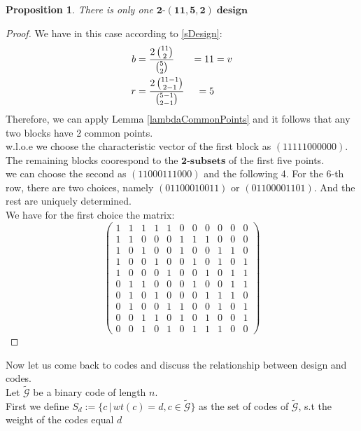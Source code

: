 \documentclass{article}
\newtheorem{prop}[theorem]{Proposition}
\numberwithin{equation}{theorem}
\numberwithin{figure}{theorem}
\newcommand{\tParamDesign}[4]{\ensuremath{\bm{#1\mbox{-}(#2,#3,#4)\; design}}}
\newcommand{\cCodes}{\ensuremath{\widetilde{\mathscr{G}}}}
\newcommand{\tSubset}[1]{\ensuremath{\bm{#1\mbox{-}{subset}}}}
\newcommand{\wloe}{w.l.o.e}
\begin{document}
\begin{prop}\label{onlyOneDesign}
There is only one \tParamDesign{2}{11}{5}{2}
\end{prop}
\begin{proof}
We have in this case according to \eqref{sDesign}:
\begin{alignat}{3}
	b &= \frac{2\,\binom{11}{2}}{\binom{5}{2}} & = 11 &= v \notag\\
	r &= \frac{2 \, \binom{11-1}{2 - 1}}{\binom{5-1}{2 - 1}} & = 5 & \notag\phantom{v} 
\end{alignat}
Therefore, we can apply Lemma \ref{lambdaCommonPoints} and it follows that any two blocks have 2 common points.\\
{\wloe} we choose the characteristic vector of the first block as 
$(1 1 1 1 1 0 0 0 0 0 0)$. The remaining blocks coorespond to the {\tSubset{2}}\textbf{s} of the first five points.\\
we can choose the second as $(1 1 0 0 0 1 1 1 0 0 0)$ and the following 4. For the $6$-th row, there are two choices, namely
$(0 1 1 0 0 0 1 0 0 1 1)$ or $(0 1 1 0 0 0 0 1 1 0 1)$. And the rest are uniquely determined. \\
We have for the first choice the matrix:
\[
	\begin{pmatrix}
 1 & 1 & 1 & 1 & 1 & 0 & 0 & 0 & 0 & 0 & 0 \\
 1 & 1 & 0 & 0 & 0 & 1 & 1 & 1 & 0 & 0 & 0 \\
 1 & 0 & 1 & 0 & 0 & 1 & 0 & 0 & 1 & 1 & 0 \\
 1 & 0 & 0 & 1 & 0 & 0 & 1 & 0 & 1 & 0 & 1 \\
 1 & 0 & 0 & 0 & 1 & 0 & 0 & 1 & 0 & 1 & 1 \\
 0 & 1 & 1 & 0 & 0 & 0 & 1 & 0 & 0 & 1 & 1 \\
 0 & 1 & 0 & 1 & 0 & 0 & 0 & 1 & 1 & 1 & 0 \\
 0 & 1 & 0 & 0 & 1 & 1 & 0 & 0 & 1 & 0 & 1 \\
 0 & 0 & 1 & 1 & 0 & 1 & 0 & 1 & 0 & 0 & 1 \\
 0 & 0 & 1 & 0 & 1 & 0 & 1 & 1 & 1 & 0 & 0 
	\end{pmatrix}
\]
\end{proof}
Now let us come back to codes and discuss the relationship between design and codes.\\
Let {\cCodes} be a binary code of length $n$.\\
First we define $S_d := \{c\,|\,wt(c) = d, c \in \cCodes\}$ as the set of codes of \cCodes, s.t the weight of the codes equal $d$
\end{document}
